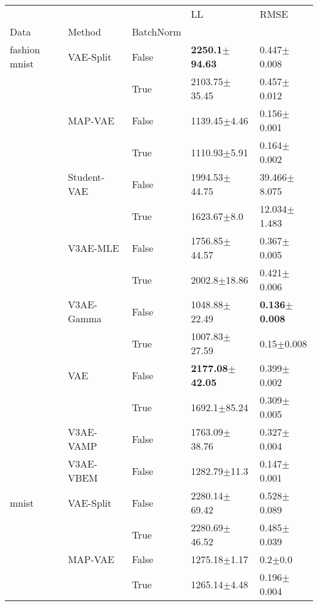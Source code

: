 \begin{tabular}{lllll}
\toprule
             &     &       &                          LL &                      RMSE \\
Data & Method & BatchNorm &                             &                           \\
\midrule
fashion mnist & VAE-Split & False &   \textbf{2250.1$\pm$94.63} &           0.447$\pm$0.008 \\
             &     & True  &           2103.75$\pm$35.45 &           0.457$\pm$0.012 \\
             & MAP-VAE & False &            1139.45$\pm$4.46 &           0.156$\pm$0.001 \\
             &     & True  &            1110.93$\pm$5.91 &           0.164$\pm$0.002 \\
             & Student-VAE & False &           1994.53$\pm$44.75 &          39.466$\pm$8.075 \\
             &     & True  &             1623.67$\pm$8.0 &          12.034$\pm$1.483 \\
             & V3AE-MLE & False &           1756.85$\pm$44.57 &           0.367$\pm$0.005 \\
             &     & True  &            2002.8$\pm$18.86 &           0.421$\pm$0.006 \\
             & V3AE-Gamma & False &           1048.88$\pm$22.49 &  \textbf{0.136$\pm$0.008} \\
             &     & True  &           1007.83$\pm$27.59 &            0.15$\pm$0.008 \\
             & VAE & False &  \textbf{2177.08$\pm$42.05} &           0.399$\pm$0.002 \\
             &     & True  &            1692.1$\pm$85.24 &           0.309$\pm$0.005 \\
             & V3AE-VAMP & False &           1763.09$\pm$38.76 &           0.327$\pm$0.004 \\
             & V3AE-VBEM & False &            1282.79$\pm$11.3 &           0.147$\pm$0.001 \\
mnist & VAE-Split & False &           2280.14$\pm$69.42 &           0.528$\pm$0.089 \\
             &     & True  &           2280.69$\pm$46.52 &           0.485$\pm$0.039 \\
             & MAP-VAE & False &            1275.18$\pm$1.17 &               0.2$\pm$0.0 \\
             &     & True  &            1265.14$\pm$4.48 &           0.196$\pm$0.004 \\

\end{tabular}
